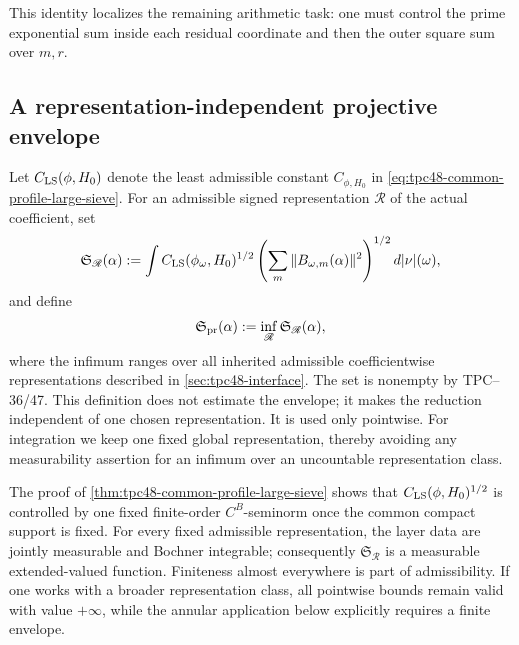 This identity localizes the remaining arithmetic task: one must control
the prime exponential sum inside each residual coordinate and then the
outer square sum over \(m,r\).

\subsection{A representation-independent projective envelope}

Let \(C_{\rm LS}(\phi,H_0)\) denote the least admissible constant
\(C_{\phi,H_0}\) in
\eqref{eq:tpc48-common-profile-large-sieve}.  For an admissible signed
representation \(\mathscr R\) of the actual coefficient, set
\begin{equation}
 \mathfrak S_{\mathscr R}(\alpha)
 :=\int C_{\rm LS}(\phi_\omega,H_0)^{1/2}
 \left(\sum_m\|B_{\omega,m}(\alpha)\|^2\right)^{1/2}
 d|\nu|(\omega),
 \label{eq:tpc48-representation-envelope}
\end{equation}
and define
\begin{equation}
 \mathfrak S_{\rm pr}(\alpha)
 :=\inf_{\mathscr R}\mathfrak S_{\mathscr R}(\alpha),
 \label{eq:tpc48-projective-envelope}
\end{equation}
where the infimum ranges over all inherited admissible
coefficientwise representations described in
\cref{sec:tpc48-interface}.  The set is nonempty by TPC--36/47.  This
definition does not estimate the envelope; it makes the reduction
independent of one chosen representation.  It is used only pointwise.
For integration we keep one fixed global representation, thereby
avoiding any measurability assertion for an infimum over an uncountable
representation class.

The proof of \cref{thm:tpc48-common-profile-large-sieve} shows that
\(C_{\rm LS}(\phi,H_0)^{1/2}\) is controlled by one fixed finite-order
\(C^B\)-seminorm once the common compact support is fixed.  For every
fixed admissible representation, the layer data are jointly
measurable and Bochner integrable; consequently
\(\mathfrak S_{\mathscr R}\) is a measurable extended-valued function.
Finiteness almost everywhere is part of admissibility.  If one works
with a broader representation class, all pointwise bounds remain valid
with value \(+\infty\), while the annular application below explicitly
requires a finite envelope.

